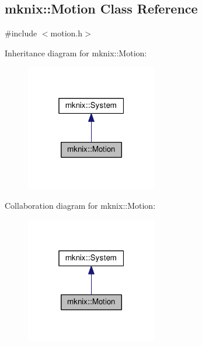 \hypertarget{classmknix_1_1_motion}{}\subsection{mknix\+:\+:Motion Class Reference}
\label{classmknix_1_1_motion}


{\ttfamily \#include $<$motion.\+h$>$}



Inheritance diagram for mknix\+:\+:Motion\+:\nopagebreak
\begin{figure}[H]
\begin{center}
\leavevmode
\includegraphics[width=163pt]{d5/db8/classmknix_1_1_motion__inherit__graph}
\end{center}
\end{figure}


Collaboration diagram for mknix\+:\+:Motion\+:\nopagebreak
\begin{figure}[H]
\begin{center}
\leavevmode
\includegraphics[width=163pt]{d6/d37/classmknix_1_1_motion__coll__graph}
\end{center}
\end{figure}
